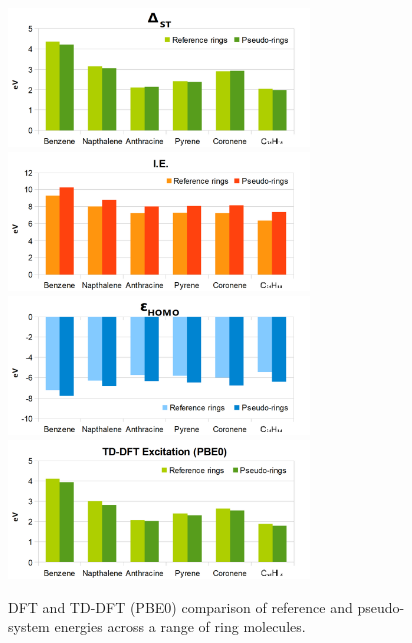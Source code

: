 \documentclass[journal=jctcce,manuscript=article]{achemso}
\begin{document}
\begin{figure}[h]
\includegraphics[width=8cm]{ring_pbe0_excitation}
\includegraphics[width=8cm]{ring_pbe0_ionisation}
\includegraphics[width=8cm]{ring_pbe0_homo}
\includegraphics[width=8cm]{ring_tddft_excitation}
\caption{DFT and TD-DFT (PBE0) comparison of reference and pseudo-system energies across a range of ring molecules.}
\label{fig:rings_graphs}
\end{figure}
\end{document}

